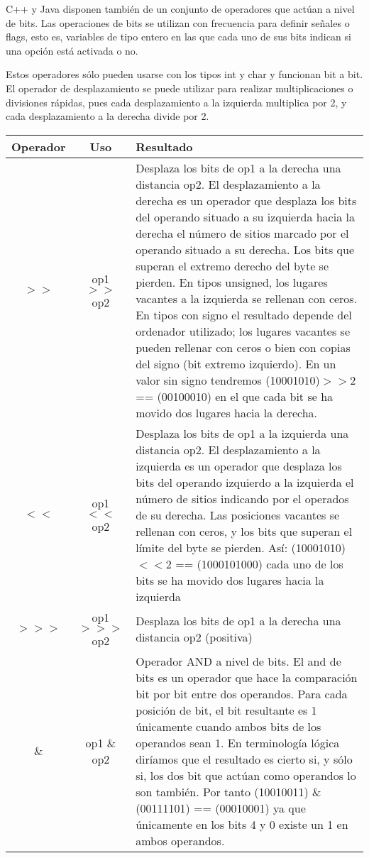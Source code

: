 C++ y Java disponen también de un conjunto de operadores que actúan a nivel de bits. Las operaciones de
bits se utilizan con frecuencia para definir señales o flags, esto es, variables de tipo entero en las que
cada uno de sus bits indican si una opción está activada o no.

Estos operadores sólo pueden usarse con los tipos int y char y funcionan bit a bit. El operador de desplazamiento se puede utilizar para realizar multiplicaciones o divisiones rápidas, pues cada desplazamiento a la izquierda multiplica por 2, y cada desplazamiento a la derecha divide por 2.

\begin{longtable}{|c|c|p{11cm}|}
	\hline
	\textbf{Operador}	& \textbf{Uso} & \textbf{Resultado}  \\
	\hline
	$>>$ & op1 $>>$ op2 & Desplaza los bits de op1 a la derecha una distancia op2. El desplazamiento a la derecha es un operador que desplaza los bits del operando
	situado a su izquierda hacia la derecha el número de sitios marcado por el operando
	situado a su derecha. Los bits que superan el extremo derecho del byte se pierden.
	En tipos unsigned, los lugares vacantes a la izquierda se rellenan con ceros. En tipos
	con signo el resultado depende del ordenador utilizado; los lugares vacantes se pueden
	rellenar con ceros o bien con copias del signo (bit extremo izquierdo). En un valor sin
	signo tendremos (10001010)$>>$2 == (00100010) en el que cada bit se ha movido dos lugares hacia la derecha. \\
	\hline
	$<<$ & op1 $<<$ op2 & Desplaza los bits de op1 a la izquierda una distancia op2. El desplazamiento a la izquierda es un operador que desplaza los bits del operando
	izquierdo a la izquierda el número de sitios indicando por el operados de su derecha.
	Las posiciones vacantes se rellenan con ceros, y los bits que superan el límite del byte
	se pierden. Así: (10001010)$<<$2 == (1000101000) cada uno de los bits se ha movido dos lugares hacia la izquierda \\
	\hline
	$>>>$ & op1 $>>>$ op2 & Desplaza los bits de op1 a la derecha una distancia op2 (positiva) \\
	\hline
	\& & op1 \& op2 & Operador AND a nivel de bits. El and de bits es un operador que hace la comparación bit por bit entre dos operandos. Para
	cada posición de bit, el bit resultante es 1 únicamente cuando ambos bits de los operandos
	sean 1. En terminología lógica diríamos que el resultado es cierto si, y sólo si, los dos bit
	que actúan como operandos lo son también. Por tanto (10010011) \& (00111101) == (00010001) ya que únicamente en los bits 4 y 0 existe un 1 en ambos operandos.\\

\end{longtable}
